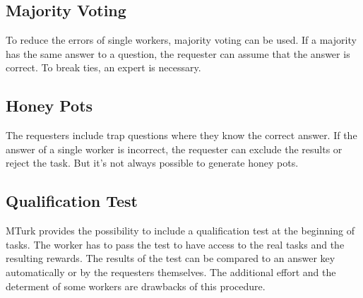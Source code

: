 \subsection{Majority Voting}
To reduce the errors of single workers, majority voting can be used. If a majority has the same answer to a question, the requester can assume that the answer is correct. To break ties, an expert is necessary. 
\subsection{Honey Pots}
\label{sub:honeypots}
The requesters include trap questions where they know the correct answer. If the answer of a single worker is incorrect, the requester can exclude the results or reject the task. But it's not always possible to generate honey pots. 
\subsection{Qualification Test}
MTurk provides the possibility to include a qualification test at the beginning of tasks. The worker has to pass the test to have access to the real tasks and the resulting rewards. The results of the test can be compared to an answer key automatically or by the requesters themselves. The additional effort and the determent of some workers are drawbacks of this procedure.

